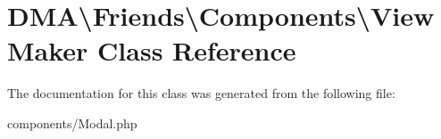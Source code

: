 \hypertarget{classDMA_1_1Friends_1_1Components_1_1ViewMaker}{\section{D\-M\-A\textbackslash{}Friends\textbackslash{}Components\textbackslash{}View\-Maker Class Reference}
\label{classDMA_1_1Friends_1_1Components_1_1ViewMaker}
}


The documentation for this class was generated from the following file\-:\begin{DoxyCompactItemize}
\item 
components/Modal.\-php\end{DoxyCompactItemize}
